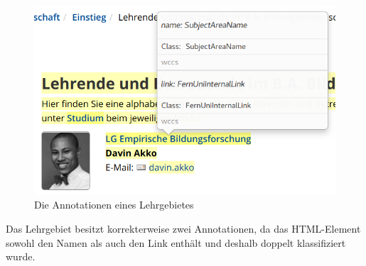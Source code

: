     \begin{figure}[htb]
        \centering
        \includegraphics[scale=\screenshotScaleFactor]{../resources/findings/case-study-1/babw/annotations/double-lg-annotation.png}
        \caption{Die Annotationen eines Lehrgebietes}
        \label{image:findingTeachersSubjectAreaAnnotations}
    \end{figure}

    Das Lehrgebiet besitzt korrekterweise zwei Annotationen,
    da das HTML-Element sowohl den Namen als auch den Link enthält
    und deshalb doppelt klassifiziert wurde.